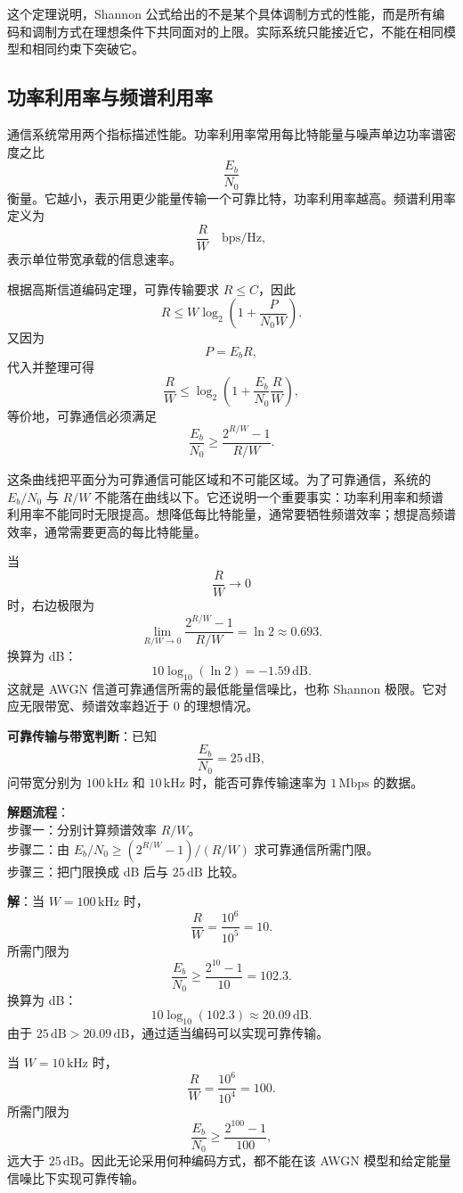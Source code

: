 这个定理说明，Shannon 公式给出的不是某个具体调制方式的性能，而是所有编码和调制方式在理想条件下共同面对的上限。实际系统只能接近它，不能在相同模型和相同约束下突破它。

\subsection{功率利用率与频谱利用率}

通信系统常用两个指标描述性能。功率利用率常用每比特能量与噪声单边功率谱密度之比
\[
\frac{E_b}{N_0}
\]
衡量。它越小，表示用更少能量传输一个可靠比特，功率利用率越高。频谱利用率定义为
\[
\frac{R}{W}
\quad\text{bps/Hz},
\]
表示单位带宽承载的信息速率。

根据高斯信道编码定理，可靠传输要求 $R\le C$，因此
\[
R\le W\log_2\left(1+\frac{P}{N_0W}\right).
\]
又因为
\[
P=E_bR,
\]
代入并整理可得
\[
\frac{R}{W}\le\log_2\left(1+\frac{E_b}{N_0}\frac{R}{W}\right),
\]
等价地，可靠通信必须满足
\[
\frac{E_b}{N_0}\ge
\frac{2^{R/W}-1}{R/W}.
\]

这条曲线把平面分为可靠通信可能区域和不可能区域。为了可靠通信，系统的 $E_b/N_0$ 与 $R/W$ 不能落在曲线以下。它还说明一个重要事实：功率利用率和频谱利用率不能同时无限提高。想降低每比特能量，通常要牺牲频谱效率；想提高频谱效率，通常需要更高的每比特能量。

当
\[
\frac{R}{W}\to0
\]
时，右边极限为
\[
\lim_{R/W\to0}\frac{2^{R/W}-1}{R/W}=\ln2\approx0.693.
\]
换算为 dB：
\[
10\log_{10}(\ln2)=-1.59\,\mathrm{dB}.
\]
这就是 AWGN 信道可靠通信所需的最低能量信噪比，也称 Shannon 极限。它对应无限带宽、频谱效率趋近于 $0$ 的理想情况。

\begin{example}
\label{ex:ch8-reliable-transmission-bandwidth}
\textbf{可靠传输与带宽判断}：已知
\[
\frac{E_b}{N_0}=25\,\mathrm{dB},
\]
问带宽分别为 $100\,\mathrm{kHz}$ 和 $10\,\mathrm{kHz}$ 时，能否可靠传输速率为 $1\,\mathrm{Mbps}$ 的数据。

\noindent \textbf{解题流程}：\\[2pt]
步骤一：分别计算频谱效率 $R/W$。\\
步骤二：由 $E_b/N_0\ge(2^{R/W}-1)/(R/W)$ 求可靠通信所需门限。\\
步骤三：把门限换成 dB 后与 $25\,\mathrm{dB}$ 比较。

\textbf{解}：当 $W=100\,\mathrm{kHz}$ 时，
\[
\frac{R}{W}=\frac{10^6}{10^5}=10.
\]
所需门限为
\[
\frac{E_b}{N_0}\ge\frac{2^{10}-1}{10}=102.3.
\]
换算为 dB：
\[
10\log_{10}(102.3)\approx20.09\,\mathrm{dB}.
\]
由于 $25\,\mathrm{dB}>20.09\,\mathrm{dB}$，通过适当编码可以实现可靠传输。

当 $W=10\,\mathrm{kHz}$ 时，
\[
\frac{R}{W}=\frac{10^6}{10^4}=100.
\]
所需门限为
\[
\frac{E_b}{N_0}\ge\frac{2^{100}-1}{100},
\]
远大于 $25\,\mathrm{dB}$。因此无论采用何种编码方式，都不能在该 AWGN 模型和给定能量信噪比下实现可靠传输。
\end{example}

